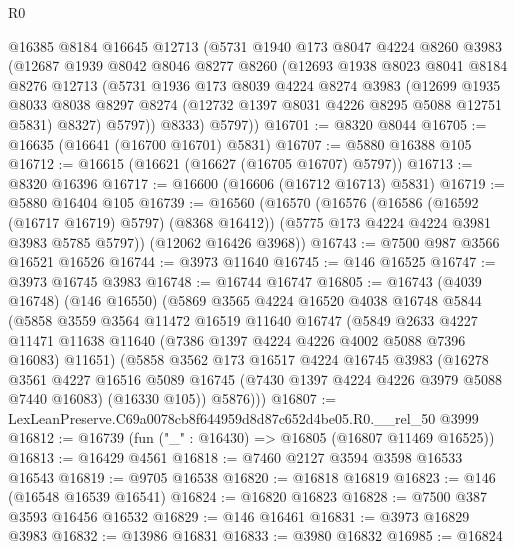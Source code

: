 \begin{lexlean}{R0}
\begin{coremodule}
      @16385
      @8184
      @16645
      @12713
      (@5731
        @1940
        @173
        @8047
        @4224
        @8260
        @3983
        (@12687
          @1939
          @8042
          @8046
          @8277
          @8260
          (@12693
            @1938
            @8023
            @8041
            @8184
            @8276
            @12713
            (@5731
              @1936
              @173
              @8039
              @4224
              @8274
              @3983
              (@12699
                @1935
                @8033
                @8038
                @8297
                @8274
                (@12732 @1397 @8031 @4226 @8295 @5088 @12751 @5831)
                @8327)
              @5797))
          @8333)
        @5797))
@16701 := @8320 @8044
@16705 := @16635 (@16641 (@16700 @16701) @5831)
@16707 := @5880 @16388 @105
@16712 := @16615 (@16621 (@16627 (@16705 @16707) @5797))
@16713 := @8320 @16396
@16717 := @16600 (@16606 (@16712 @16713) @5831)
@16719 := @5880 @16404 @105
@16739 := @16560
    (@16570
      (@16576
        (@16586 (@16592 (@16717 @16719) @5797) (@8368 @16412))
        (@5775 @173 @4224 @4224 @3981 @3983 @5785 @5797))
      (@12062 @16426 @3968))
@16743 := @7500 @987 @3566 @16521 @16526
@16744 := @3973 @11640
@16745 := @146 @16525
@16747 := @3973 @16745 @3983
@16748 := @16744 @16747
@16805 := @16743
    (@4039 @16748)
    (@146 @16550)
    (@5869
      @3565
      @4224
      @16520
      @4038
      @16748
      @5844
      (@5858
        @3559
        @3564
        @11472
        @16519
        @11640
        @16747
        (@5849
          @2633
          @4227
          @11471
          @11638
          @11640
          (@7386 @1397 @4224 @4226 @4002 @5088 @7396 @16083)
          @11651)
        (@5858
          @3562
          @173
          @16517
          @4224
          @16745
          @3983
          (@16278
            @3561
            @4227
            @16516
            @5089
            @16745
            (@7430 @1397 @4224 @4226 @3979 @5088 @7440 @16083)
            (@16330 @105))
          @5876)))
@16807 := LexLeanPreserve.C69a0078cb8f644959d8d87c652d4be05.R0.__rel_50 @3999
@16812 := @16739 (fun ("_" : @16430) => @16805 (@16807 @11469 @16525))
@16813 := @16429 @4561
@16818 := @7460 @2127 @3594 @3598 @16533 @16543
@16819 := @9705 @16538
@16820 := @16818 @16819
@16823 := @146 (@16548 @16539 @16541)
@16824 := @16820 @16823
@16828 := @7500 @387 @3593 @16456 @16532
@16829 := @146 @16461
@16831 := @3973 @16829 @3983
@16832 := @13986 @16831
@16833 := @3980 @16832
@16985 := @16824

\end{coremodule}
\end{lexlean}
